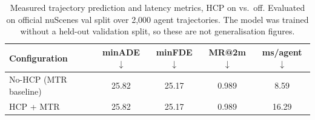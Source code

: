 %
\begin{table}[h]
\centering
\caption{Measured trajectory prediction and latency metrics, HCP on vs.\ off.
Evaluated on official nuScenes val split over 2,000 agent trajectories.
The model was trained without a held-out validation split, so these are not
generalisation figures.}
\label{tab:benchmarks}
\begin{tabular}{lcccc}
\toprule
\textbf{Configuration} & \textbf{minADE} $\downarrow$ & \textbf{minFDE} $\downarrow$ & \textbf{MR@2m} $\downarrow$ & \textbf{ms/agent} $\downarrow$ \\
\midrule
No-HCP (MTR baseline) & 25.82 & 25.17 & 0.989 & 8.59 \\
HCP + MTR             & 25.82 & 25.17 & 0.989 & 16.29 \\
\bottomrule
\end{tabular}
\end{table}

